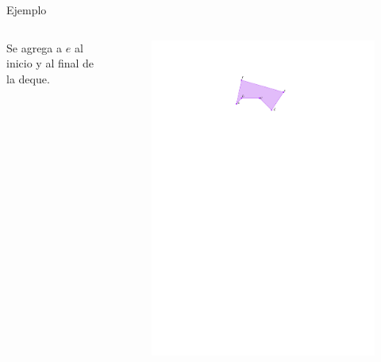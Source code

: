 \documentclass[aspectratio=169,xcolor=dvipsnames, t]{beamer}
\begin{document}
\begin{frame}{Ejemplo}
  \begin{columns}
    \begin{column}{0.5\textwidth}
      Se agrega a $e$ al inicio y al final de la deque.
    \end{column}
    \begin{column}{0.5\textwidth}
      \begin{figure}
        \centering
        \includegraphics[width=\linewidth, height=0.5\textheight, page=10, keepaspectratio]{IPE/Melkman.pdf}
      \end{figure}
    \end{column}
  \end{columns}
\end{frame}
\end{document}
